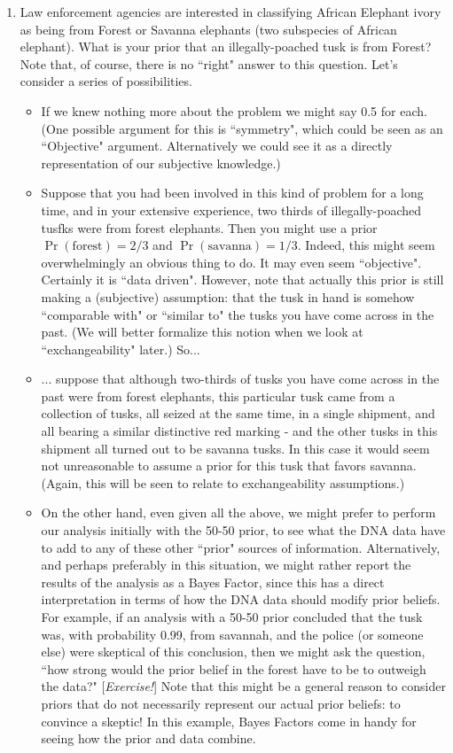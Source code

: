 \documentclass[12pt]{article}
\begin{document}
\begin{enumerate}
  \item Law enforcement agencies are interested in classifying African Elephant ivory as being from Forest or Savanna elephants (two subspecies of African elephant). What is your prior that an illegally-poached tusk is from Forest? Note that, of course, there is no ``right" answer to this question. Let's consider a series of possibilities.
  \begin{itemize}
  \item If we knew nothing more about the problem we might say 0.5 for each. (One possible argument for this is ``symmetry", which could
  be seen as an ``Objective" argument. Alternatively we could see it as a directly representation of our subjective knowledge.)
  \item Suppose that you had been involved in this kind of problem for a long time, and in your extensive experience, two thirds of illegally-poached tusfks
  were from forest elephants. Then you might use a prior $\Pr(\text{forest}) = 2/3$ and $\Pr(\text{savanna}) = 1/3$.
  Indeed, this might seem overwhelmingly an obvious thing to do. It may even seem ``objective". Certainly it is ``data driven". However, note
  that actually this prior is still making a (subjective) assumption: that the tusk in hand is somehow ``comparable with" or ``similar to" the tusks
  you have come across in the past. (We will better formalize this notion when we look at ``exchangeability" later.)  So...
  \item ... suppose that although two-thirds of tusks you have  come across in the past were from forest elephants, this particular tusk came
  from a collection of tusks, all seized at the same time, in a single shipment, and all bearing a similar distinctive red marking - and the other tusks in this shipment
  all turned out to be savanna tusks. In this case it would seem not unreasonable to assume a prior for this tusk that favors savanna. (Again, this will
  be seen to relate to exchangeability assumptions.)
  \item On the other hand, even given all the above, we might prefer to perform our analysis initially with the 50-50 prior, to see what the DNA data have
  to add to any of these other ``prior" sources of information. Alternatively, and perhaps preferably in this situation, we might rather report the results
  of the analysis as a Bayes Factor, since this has a direct interpretation in terms of how the DNA data should modify prior beliefs.
  For example, if an analysis with a 50-50 prior concluded that the tusk was, with probability 0.99, from savannah, and the police (or someone else) were skeptical of this conclusion, then we might ask the question, ``how strong would the prior belief in the forest have to be to outweigh the data?" [{\it Exercise!}] Note that this might be a general reason to consider priors that do not necessarily represent our actual prior beliefs: to convince a skeptic! In this example, Bayes Factors come in handy for seeing how the prior and data combine.
\end{itemize}  
  

\end{enumerate}
\end{document}
